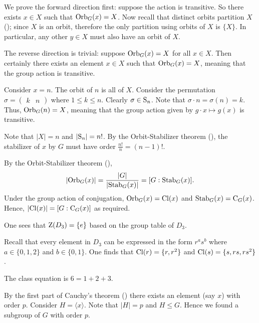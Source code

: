 \begin{questions}
    \item We prove the forward direction first: suppose the action is transitive. So there exists $x \in X$ such that $\mathrm{Orb}_{G}(x) = X$. Now recall that distinct orbits partition $X$ (); since $X$ is an orbit, therefore the only partition using orbits of $X$ is $\{X\}$. In particular, any other $y \in X$ must also have an orbit of $X$.

    The reverse direction is trivial: suppose $\mathrm{Orb}_{G}(x) = X$ for all $x \in X$. Then certainly there exists an element $x \in X$ such that $\mathrm{Orb}_{G}(x) = X$, meaning that the group action is transitive.

    \item \begin{partquestions}{\alph*}
        \item Consider $x = n$. The orbit of $n$ is all of $X$. Consider the permutation $\sigma = \begin{pmatrix}k & n\end{pmatrix}$ where $1 \leq k \leq n$. Clearly $\sigma \in \mathrm{S}_{n}$. Note that $\sigma \cdot n = \sigma(n) = k$. Thus, $\mathrm{Orb}_{G}(n) = X$, meaning that the group action given by $g \cdot x \mapsto g(x)$ is transitive.

        \item Note that $|X| = n$ and $|\mathrm{S}_{n}| = n!$. By the Orbit-Stabilizer theorem (), the stabilizer of $x$ by $G$ must have order $\frac{n!}{n} = (n-1)!$.
    \end{partquestions}

    \item By the Orbit-Stabilizer theorem (),
    \[
        |\mathrm{Orb}_{G}(x)| = \frac{|G|}{|\mathrm{Stab}_{G}(x)|} = [G : \mathrm{Stab}_{G}(x)].
    \]
    Under the group action of conjugation, $\mathrm{Orb}_{G}(x) = \mathrm{Cl}(x)$ and $\mathrm{Stab}_{G}(x) = \mathrm{C}_{G}(x)$. Hence, $|\mathrm{Cl}(x)| = [G : \mathrm{C}_{G}(x)]$ as required.

    \item \begin{partquestions}{\alph*}
        \item One sees that $\mathrm{Z}(D_3) = \{e\}$ based on the group table of $D_3$.
        \item Recall that every element in $D_3$ can be expressed in the form $r^as^b$ where $a \in \{0, 1, 2\}$ and $b \in \{0, 1\}$. One finds that $\mathrm{Cl}(r) = \{r, r^2\}$ and $\mathrm{Cl}(s) = \{s, rs, rs^2\}$.
        \item The class equation is $6 = 1 + 2 + 3$.
    \end{partquestions}

    \item By the first part of Cauchy's theorem () there exists an element (say $x$) with order $p$. Consider $H = \langle x \rangle$. Note that $|H| = p$ and $H \leq G$. Hence we found a subgroup of $G$ with order $p$.
\end{questions}

